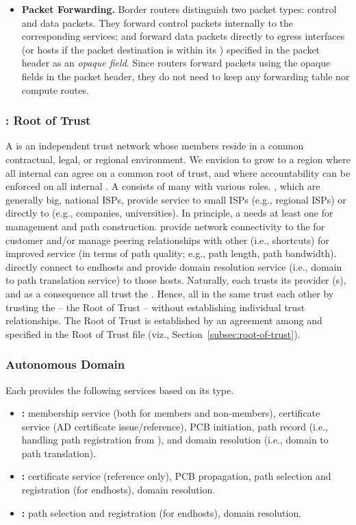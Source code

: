\begin{itemize}
\item {\bf Packet Forwarding. } Border routers distinguish two packet types:
  control and data packets. They forward control packets internally to the
  corresponding services; and forward data packets directly to egress interfaces
  (or hosts if the packet destination is within its \AD) specified in the packet
  header as an \textit{opaque field}. Since routers forward packets using the
  opaque fields in the packet header, they do not need to keep any forwarding
  table nor compute routes.
\end{itemize}

\subsubsection{\TD: Root of Trust}

A \TD is an independent {trust} network whose members reside in a common
contractual, legal, or regional environment. We envision \TDs to grow to a
region where all internal \ADs can agree on a common root of trust, and where
accountability can be enforced on all internal \ADs. A \TD consists of many \ADs
with various roles. \TDC \ADs, which are generally big, national ISPs, provide
service to small ISPs (e.g., regional ISPs) or directly to \STUB \ADs (e.g.,
companies, universities). In principle, a \TD needs at least one \TDC \AD for
\TD management and path construction. \TRAN \ADs provide network connectivity to
the \TDC for customer \ADs and/or manage peering relationships with other \TRAN \ADs
(i.e., shortcuts) for improved service (in terms of path quality; e.g., path
length, path bandwidth). \STUB \ADs directly connect to endhosts and provide
domain resolution service (i.e., domain to path translation service) to those
hosts. Naturally, each \AD trusts its provider \AD(s), and as a consequence all
\ADs trust the \TDC. Hence, all \STUB \ADs in the same \TD trust each other by
trusting the \TDC -- the Root of Trust -- without establishing individual trust
relationships. The Root of Trust is established by an agreement among \TDC \ADs
and specified in the Root of Trust file (viz., Section~\ref{subsec:root-of-trust}).

\subsubsection{Autonomous Domain}
Each \AD provides the following services based on its type.
\begin{itemize}
\item {\bf \TDC \AD: } \TD membership service (both for \TDC members and non-\TDC members), certificate service (AD certificate issue/reference), PCB initiation, path record (i.e., handling path registration from \STUB \ADs), and domain resolution (i.e., domain to path translation).
\item {\bf \TRAN \AD: } certificate service (reference only), PCB propagation, path selection and registration (for endhosts), domain resolution.
\item {\bf \STUB \AD: } path selection and registration (for endhosts), domain resolution. 
\end{itemize}

